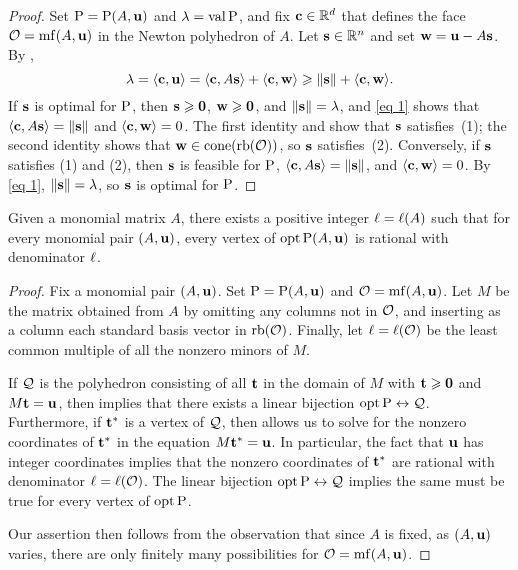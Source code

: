 \documentclass[11pt]{amsart}
\begin{document}
\begin{proof}
   Set $\mathrm{P} = \mathrm{P}(A, \mathbf{u})$ and $\lambda = \operatorname{val} \mathrm{P} $, and fix $\mathbf{c} \in \mathbb{R}^d$ that defines the face $\mathcal{O} = \operatorname{mf}(A, \mathbf{u})$ in the Newton polyhedron of $A$.
   Let $\mathbf{s} \in \mathbb{R}^n$ and set $\mathbf{w} = \mathbf{u} - A\mathbf{s}$.
   By ,
   \begin{equation}\label{eq 1}
      \lambda = \langle \mathbf{c}, \mathbf{u} \rangle = \langle \mathbf{c}, A \mathbf{s} \rangle + \langle \mathbf{c}, \mathbf{w} \rangle \geqslant \| \mathbf{s} \| + \langle \mathbf{c}, \mathbf{w} \rangle.
   \end{equation}
   If $\mathbf{s}$ is optimal for $\mathrm{P}$, then $\mathbf{s} \geqslant \mathbf{0}$, $\mathbf{w} \geqslant \mathbf{0}$, and $\| \mathbf{s} \| = \lambda$, and \eqref{eq 1} shows that $\langle \mathbf{c}, A \mathbf{s} \rangle = \| \mathbf{s} \|$ and $\langle \mathbf{c}, \mathbf{w} \rangle = 0$.
   The first identity and  show that $\mathbf{s}$ satisfies~(1); the second identity shows that $\mathbf{w}\in \operatorname{cone}(\operatorname{rb}(\mathcal{O}))$, so $\mathbf{s}$ satisfies~(2).
   Conversely, if $\mathbf{s}$ satisfies (1) and (2), then $\mathbf{s}$ is feasible for $\mathrm{P}$, $\langle \mathbf{c}, A \mathbf{s} \rangle = \| \mathbf{s} \|$, and $\langle \mathbf{c}, \mathbf{w} \rangle = 0$.
   By \eqref{eq 1}, $\| \mathbf{s} \| = \lambda$, so $\mathbf{s}$ is optimal for $\mathrm{P}$.
\end{proof}

\begin{theorem}
\label{uniform denominators for vertices:  T}
Given a monomial matrix $A$, there exists a positive integer $\ell = \ell(A)$ such that for every monomial pair $(A, \mathbf{u})$, every vertex of $\operatorname{opt} \mathrm{P}(A, \mathbf{u})$ is rational with denominator $\ell$.
\end{theorem}

\begin{proof}
Fix a monomial pair $(A, \mathbf{u})$. Set $\mathrm{P} = \mathrm{P}(A, \mathbf{u})$ and $\mathcal{O} = \operatorname{mf}(A, \mathbf{u})$.  Let $M$ be the matrix obtained from $A$ by omitting any columns not in $\mathcal{O}$, and inserting as a column each standard basis vector in $\operatorname{rb}(\mathcal{O})$.  Finally, let $\ell = \ell(\mathcal{O})$ be the least common multiple of all the nonzero minors of $M$.

If $\mathcal{Q}$ is the polyhedron consisting of all $\mathbf{t}$ in the domain of $M$ with $\mathbf{t} \geqslant \mathbf{0}$ and $M \mathbf{t} = \mathbf{u}$, then  implies that there exists a linear bijection $\operatorname{opt} \mathrm{P}
\leftrightarrow \mathcal{Q}$.  Furthermore, if $\mathbf{t}^{\ast}$ is a vertex of $\mathcal{Q}$, then  allows us to solve for the nonzero coordinates of $\mathbf{t}^{\ast}$ in the equation $M \mathbf{t}^{\ast} = \mathbf{u}$.  In particular, the fact that $\mathbf{u}$ has integer coordinates implies that the nonzero coordinates of $\mathbf{t}^{\ast}$ are rational with denominator $\ell = \ell(\mathcal{O})$.  The linear bijection $\operatorname{opt} \mathrm{P} \leftrightarrow \mathcal{Q}$ implies the same must be true for every vertex of $\operatorname{opt} \mathrm{P}$.

Our assertion then follows from the observation that since $A$ is fixed, as $(A, \mathbf{u})$ varies, there are only finitely many possibilities for $\mathcal{O} = \operatorname{mf}(A, \mathbf{u})$.
\end{proof}
\end{document}
